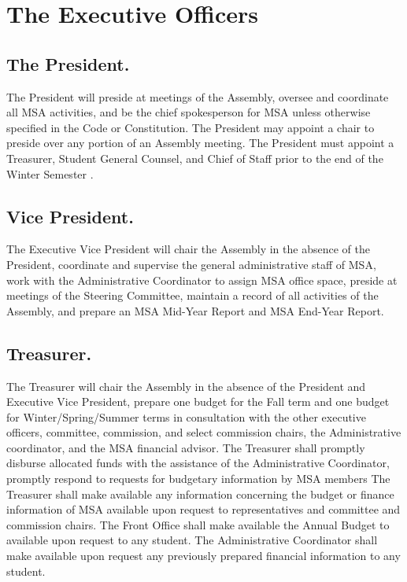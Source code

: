 
\section{The Executive Officers}

\subsection{The President.}
The President will preside at meetings of the Assembly, oversee and coordinate all MSA activities, and be the chief spokesperson for MSA unless otherwise specified in the Code or Constitution.  The President may appoint a chair to preside over any portion of an Assembly meeting.  The President must appoint a Treasurer, Student General Counsel, and Chief of Staff prior to the end of the Winter Semester .

\subsection{Vice President.}
The Executive Vice President will chair the Assembly in the absence of the President, coordinate and supervise the general administrative staff of MSA, work with the Administrative Coordinator to assign MSA office space, preside at meetings of the Steering Committee, maintain a record of all activities of the Assembly, and prepare an MSA Mid-Year Report and MSA End-Year Report.

\subsection{Treasurer.}
The Treasurer will chair the Assembly in the absence of the President and Executive Vice President, prepare one budget for the Fall term and one budget for Winter/Spring/Summer terms in consultation with the other executive officers, committee, commission, and select commission chairs, the Administrative coordinator, and the MSA financial advisor. The Treasurer shall promptly disburse allocated funds with the assistance of the Administrative Coordinator, promptly respond to requests for budgetary information by MSA members The Treasurer shall make available any information concerning the budget or finance information of MSA available upon request to representatives and committee and commission chairs. The Front Office shall make available the Annual Budget to available upon request to any student. The Administrative Coordinator shall make available upon request any previously prepared financial information to any student. 

